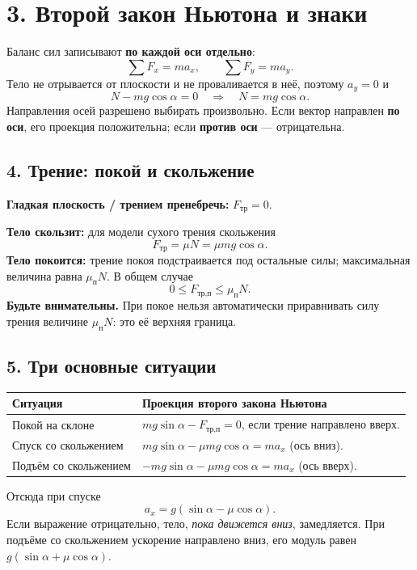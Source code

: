 \documentclass[a4paper,12pt]{article}
\newcommand{\sectionline}[1]{\section*{\textcolor{darkaccent}{#1}}}
\newcommand{\subhead}[1]{\subsection*{\textcolor{darkaccent}{#1}}}
\newcommand{\warn}[1]{\textcolor{softred}{\textbf{Будьте внимательны.}} #1}
\begin{document}
\clearpage
\sectionline{3. Второй закон Ньютона и знаки}
Баланс сил записывают \textbf{по каждой оси отдельно}:
\[
\sum F_x=ma_x, \qquad \sum F_y=ma_y.
\]
Тело не отрывается от плоскости и не проваливается в неё, поэтому $a_y=0$ и
\[
\boxed{N-mg\cos\alpha=0 \quad\Longrightarrow\quad N=mg\cos\alpha.}
\]
Направления осей разрешено выбирать произвольно. Если вектор направлен \textbf{по оси}, его проекция положительна; если \textbf{против оси} — отрицательна.

\subhead{4. Трение: покой и скольжение}
\textbf{Гладкая плоскость / трением пренебречь:} $F_{\text{тр}}=0$.

\textbf{Тело скользит:} для модели сухого трения скольжения
\[
\boxed{F_{\text{тр}}=\mu N=\mu mg\cos\alpha.}
\]
\textbf{Тело покоится:} трение покоя подстраивается под остальные силы; максимальная величина равна $\mu_{\text{п}}N$. В общем случае
\[
\boxed{0\le F_{\text{тр,п}}\le \mu_{\text{п}}N.}
\]
\warn{При покое нельзя автоматически приравнивать силу трения величине $\mu_{\text{п}}N$: это её верхняя граница.}

\subhead{5. Три основные ситуации}
\begin{tabularx}{\linewidth}{@{}p{43mm}X@{}}
\toprule
\textbf{Ситуация} & \textbf{Проекция второго закона Ньютона}\ \\ \midrule
Покой на склоне & $mg\sin\alpha-F_{\text{тр,п}}=0$, если трение направлено вверх. \\
Спуск со скольжением & $mg\sin\alpha-\mu mg\cos\alpha=ma_x$ (ось вниз). \\
Подъём со скольжением & $-mg\sin\alpha-\mu mg\cos\alpha=ma_x$ (ось вверх). \\
\bottomrule
\end{tabularx}
Отсюда при спуске
\[
\boxed{a_x=g(\sin\alpha-\mu\cos\alpha).}
\]
Если выражение отрицательно, тело, \emph{пока движется вниз}, замедляется. При подъёме со скольжением ускорение направлено вниз, его модуль равен $g(\sin\alpha+\mu\cos\alpha)$.
\end{document}

